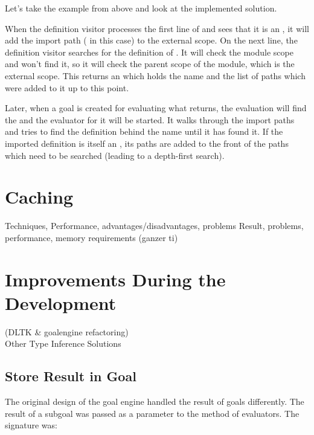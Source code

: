 \documentclass[12pt,halfparskip,DIV11,BCOR10mm]{scrreprt}
\begin{document}
Let's take the example from above and look at the implemented solution.

When the definition visitor processes the first line of  and sees that it is an , it will add the import path ( in this case) to the external scope. On the next line, the definition visitor searches for the definition of . It will check the module scope and won't find it, so it will check the parent scope of the module, which is the external scope. This returns an  which holds the name and the list of  paths which were added to it up to this point.

Later, when a goal is created for evaluating what  returns, the evaluation will find the  and the evaluator for it will be started. It walks through the import paths and tries to find the definition behind the name  until it has found it. If the imported definition is itself an , its paths are added to the front of the paths which need to be searched (leading to a depth-first search).


\section{Caching}
 Techniques, Performance, advantages/disadvantages, problems
 Result, problems, performance, memory requirements (ganzer ti)


\section{Improvements During the Development}

 (DLTK \& goalengine refactoring) \\
Other Type Inference Solutions

\subsection{Store Result in Goal}



The original design of the goal engine handled the result of goals differently. The result of a subgoal was passed as a parameter to the  method of evaluators. The signature was:
\end{document}
